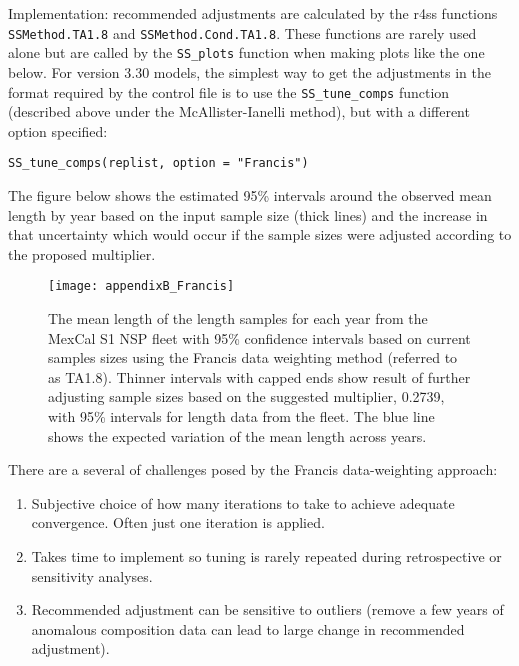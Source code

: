 Implementation: recommended adjustments are calculated by the r4ss functions \texttt{SSMethod.TA1.8} and \texttt{SSMethod.Cond.TA1.8}. These functions are rarely used alone but are called by the \texttt{SS\_plots} function when making plots like the one below. For version 3.30 models, the simplest way to get the adjustments in the format required by the control file is to use the \texttt{SS\_tune\_comps} function (described above under the McAllister-Ianelli method), but with a different option specified: 

\texttt{SS\_tune\_comps(replist, option = "Francis")}

The figure below shows the estimated 95\% intervals around the observed mean length by year based on the input sample size (thick lines) and the increase in that uncertainty which would occur if the sample sizes were adjusted according to the proposed multiplier.

\begin{figure}[h]
	\begin{center}
		\texttt{[image: appendixB\_Francis]}\\
	\end{center}
	\caption{The mean length of the length samples for each year from the MexCal S1 NSP fleet with 95\% confidence intervals based on current samples sizes using the Francis data weighting method (referred to as TA1.8). Thinner intervals with capped ends show result of further adjusting sample sizes based on the suggested multiplier, 0.2739, with 95\% intervals for length data from the fleet. The blue line shows the expected variation of the mean length across years.}
	\label{fig:francis}
\end{figure}

There are a several of challenges posed by the Francis data-weighting approach:
\begin{enumerate}
	\item Subjective choice of how many iterations to take to achieve adequate convergence. Often just one iteration is applied.
	
	\item Takes time to implement so tuning is rarely repeated during retrospective or sensitivity analyses.
	
	\item Recommended adjustment can be sensitive to outliers (remove a few years of anomalous composition data can lead to large change in recommended adjustment).
\end{enumerate}

